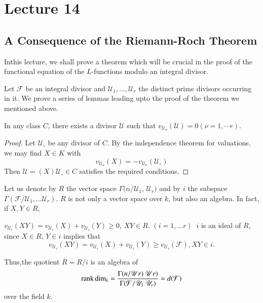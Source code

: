 \chapter{Lecture 14}\label{chap14}%

\setcounter{section}{26}
\section{A Consequence of the Riemann-Roch Theorem}\label{chap14:sec27}%

In\pageoriginale this lecture, we  shall prove a theorem which will be crucial in
the proof of the functional equation of the $L$-functions modulo an
integral divisor. 

Let $ \mathcal{F} $ be an integral divisor and $\mathscr{U}_1, \ldots,
\mathscr{U}_r$ 
the distinct prime divisors occurring in it. We prove a series of
lemmas leading upto the proof of the theorem we mentioned above.  

\setcounter{Lemma}{0}
\begin{Lemma}\label{chap14:sec27:lem1} %
  In  any class $C$, there exists a divisor $ \mathscr{U} $ such that
  $ v_{\mathscr{U}_{\nu}}(\mathscr{U}) = 0 ( \nu = 1 , \cdots r ) $. 
\end{Lemma}

\begin{proof}
  Let $ \mathscr{U}_\circ $ be any divisor of $C$. By the independence
  theorem for valuations, we may find $ X \in K $ with  
  $$
  v_{\mathscr{U}_{\nu}} (X) = - v_{\mathscr{U}_{\nu}} ( \mathscr{U}_\circ )
  $$
  Then $ \mathscr{U} = (X) \mathscr{U}_\circ \in C $ satisfies the
  required conditions. 
\end{proof}

Let us denote by $R$ the vector space $ \Gamma ( n / \mathscr{U}_1 $,
$ \mathscr{U}_r ) $ and by $i$ the subspace $ \Gamma ( \mathcal{F} /
\mathscr{U}_1, \ldots \mathscr{U}_r ) $. $R$ is not only a vector
space over $k$, but also an algebra. In fact, if $ X,Y \in R $, 

$v_{\mathscr{U}_{i}} (XY) = v_{\mathscr{U}_{i}} (X) +
v_{\mathscr{U}_{i}} (Y)  \ge 0 $, $ XY \in R $. $ ( i = 1, \dots r )~$
$i$ is an ideal of $R$, since $X \in R$,  $ Y \in i $ implies that  
$$
v_{\mathscr{U}_{i}} (XY) = v_{\mathscr{U}_{i}} (X) +
v_{\mathscr{U}_{i}} (Y)  \ge v_{\mathscr{U}_{i}} ( \mathcal{F}), XY
\in i. 
$$

Thus,\pageoriginale the quotient $ \bar{R} = R/i$ is an algebra of 
$$
\operatorname{rank}  \dim_k =
\dfrac{\Gamma (n / \mathscr{U}r) ~ \mathscr{U}r ) }{\Gamma (
  \mathcal{F} / \mathscr{U}_1 ~ \mathscr{U}_r)} = d ( \mathcal{F} ) 
$$
over the  field $k$. 

